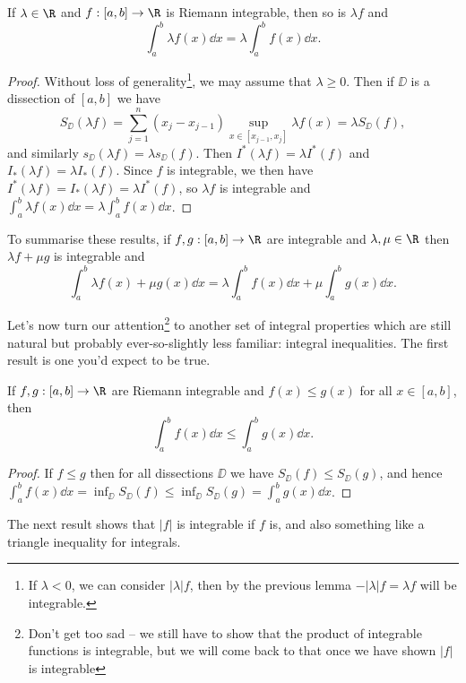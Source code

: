 \begin{proposition}
	If $\lambda \in \R$ and $f:[a, b] \rightarrow \R$ is Riemann integrable, then so is $\lambda f$ and 
	$$\int_a^b \lambda f(x) \dd x = \lambda \int_a^b f(x) \dd x.$$
\end{proposition}
\begin{proof}
	Without loss of generality\footnote{If $\lambda < 0$, we can consider $|\lambda| f$, then by the previous lemma $-|\lambda| f = \lambda f$ will be integrable.}, we may assume that $\lambda \geq 0$. Then if $\DD$ is a dissection of $[a, b]$ we have
	$$
	S_{\DD}(\lambda f) = \sum_{j = 1}^n (x_j - x_{j - 1})\sup_{x \in [x_{j - 1}, x_j]} \lambda f(x) = \lambda S_\DD(f),
	$$
	and similarly $s_{\DD}(\lambda f) = \lambda s_{\DD}(f)$. Then $I^*(\lambda f) = \lambda I^*(f)$ and $I_*(\lambda f) = \lambda I_*(f)$. Since $f$ is integrable, we then have $I^*(\lambda f) = I_*(\lambda f) = \lambda I^*(f)$, so $\lambda f$ is integrable and $\int_a^b \lambda f(x) \dd x = \lambda \int_a^b f(x) \dd x$.
\end{proof}

To summarise these results, if $f, g:[a, b] \rightarrow \R$ are integrable and $\lambda, \mu \in \R$ then $\lambda f + \mu g$ is integrable and
$$
	\int_a^b \lambda f(x) + \mu g(x) \dd x = \lambda \int_a^b f(x) \dd x + \mu \int_a^b g(x) \dd x.
$$

Let's now turn our attention\footnote{Don't get too sad -- we still have to show that the product of integrable functions is integrable, but we will come back to that once we have shown $|f|$ is integrable} to another set of integral properties which are still natural but probably ever-so-slightly less familiar: integral inequalities. The first result is one you'd expect to be true.

\begin{proposition}
	If $f, g:[a, b] \rightarrow \R$ are Riemann integrable and $f(x) \leq g(x)$ for all $x \in [a, b]$, then
	$$
	\int_a^b f(x) \dd x \leq \int_a^b g(x) \dd x.
	$$
\end{proposition}
\begin{proof}
	If $f \leq g$ then for all dissections $\DD$ we have $S_{\DD}(f) \leq S_{\DD}(g)$, and hence
	$
	\int_a^b f(x) \dd x = \inf_{\DD} S_{\DD}(f) \leq \inf_{\DD} S_{\DD}(g) = \int_{a}^b g(x) \dd x
	$.
\end{proof}

The next result shows that $|f|$ is integrable if $f$ is, and also 
something like a triangle inequality for integrals.

